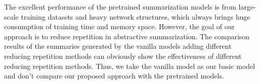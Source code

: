 The excellent performance of the pretrained summarization models 
is from large-scale training datasets and heavy network structures, 
which always brings huge consumption of training time and memory space. 
However, the goal of our approach is to reduce repetition in abstractive summarization.
The comparison results of the summaries generated by the vanilla models adding different reducing repetition methods can obviously show the effectiveness of different  reducing repetition methods.
Thus, we take the vanilla model as our basic model and don't compare our proposed approach with the pretrained models. 


